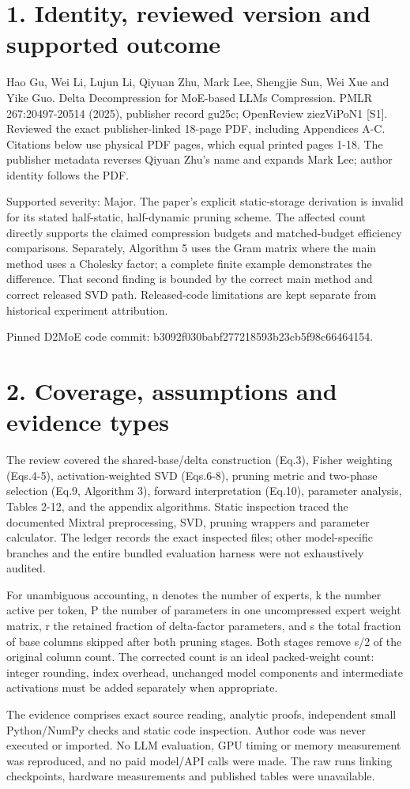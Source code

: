 \documentclass[10pt]{article}
\begin{document}
\section*{1. Identity, reviewed version and supported outcome}
Hao Gu, Wei Li, Lujun Li, Qiyuan Zhu, Mark Lee, Shengjie Sun, Wei Xue and Yike Guo. Delta Decompression for MoE-based LLMs Compression. PMLR 267:20497-20514 (2025), publisher record gu25c; OpenReview ziezViPoN1 [S1]. Reviewed the exact publisher-linked 18-page PDF, including Appendices A-C. Citations below use physical PDF pages, which equal printed pages 1-18. The publisher metadata reverses Qiyuan Zhu’s name and expands Mark Lee; author identity follows the PDF.\par
Supported severity: Major. The paper’s explicit static-storage derivation is invalid for its stated half-static, half-dynamic pruning scheme. The affected count directly supports the claimed compression budgets and matched-budget efficiency comparisons. Separately, Algorithm 5 uses the Gram matrix where the main method uses a Cholesky factor; a complete finite example demonstrates the difference. That second finding is bounded by the correct main method and correct released SVD path. Released-code limitations are kept separate from historical experiment attribution.\par
Pinned D2MoE code commit: b3092f030babf277218593b23cb5f98c66464154.\par
\section*{2. Coverage, assumptions and evidence types}
The review covered the shared-base/delta construction (Eq.3), Fisher weighting (Eqs.4-5), activation-weighted SVD (Eqs.6-8), pruning metric and two-phase selection (Eq.9, Algorithm 3), forward interpretation (Eq.10), parameter analysis, Tables 2-12, and the appendix algorithms. Static inspection traced the documented Mixtral preprocessing, SVD, pruning wrappers and parameter calculator. The ledger records the exact inspected files; other model-specific branches and the entire bundled evaluation harness were not exhaustively audited.\par
For unambiguous accounting, n denotes the number of experts, k the number active per token, P the number of parameters in one uncompressed expert weight matrix, r the retained fraction of delta-factor parameters, and s the total fraction of base columns skipped after both pruning stages. Both stages remove s/2 of the original column count. The corrected count is an ideal packed-weight count: integer rounding, index overhead, unchanged model components and intermediate activations must be added separately when appropriate.\par
The evidence comprises exact source reading, analytic proofs, independent small Python/NumPy checks and static code inspection. Author code was never executed or imported. No LLM evaluation, GPU timing or memory measurement was reproduced, and no paid model/API calls were made. The raw runs linking checkpoints, hardware measurements and published tables were unavailable.\par
\end{document}
